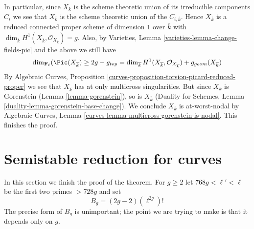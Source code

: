\medskip\noindent
In particular, since $X_k$ is the scheme theoretic union of its
irreducible components $C_i$ we see that $X_{\overline{k}}$ is the
scheme theoretic union of the $C_{i, \overline{k}}$.
Hence $X_{\overline{k}}$ is a reduced connected proper
scheme of dimension $1$ over $\overline{k}$ with $\dim_{\overline{k}}
H^1(X_{\overline{k}}, \mathcal{O}_{X_{\overline{k}}}) = g$.
Also, by Varieties, Lemma \ref{varieties-lemma-change-fields-pic}
and the above we still have
$$
\dim_{\mathbf{F}_\ell}(\Pic(X_{\overline{k}})
\geq 2g - g_{top} =
\dim_{\overline{k}} H^1(X_{\overline{k}}, \mathcal{O}_{X_{\overline{k}}})
+ g_{geom}(X_{\overline{k}})
$$
By Algebraic Curves, Proposition
\ref{curves-proposition-torsion-picard-reduced-proper}
we see that $X_{\overline{k}}$ has at only multicross singularities.
But since $X_k$ is Gorenstein (Lemma \ref{lemma-gorenstein}),
so is $X_{\overline{k}}$ (Duality for Schemes, Lemma
\ref{duality-lemma-gorenstein-base-change}).
We conclude $X_{\overline{k}}$ is at-worst-nodal by
Algebraic Curves, Lemma \ref{curves-lemma-multicross-gorenstein-is-nodal}.
This finishes the proof.










\section{Semistable reduction for curves}
\label{section-semistable-reduction-theorem}

\noindent
In this section we finish the proof of the theorem.
For $g \geq 2$ let $768g < \ell' < \ell$
be the first two primes $> 728g$ and set
\begin{equation}
\label{equation-bound}
B_g = (2g - 2)(\ell^{2g})!
\end{equation}
The precise form of $B_g$ is unimportant; the point we are trying
to make is that it depends only on $g$.

